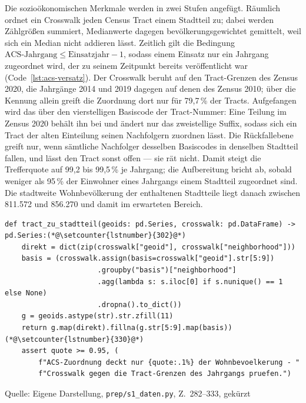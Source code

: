 \documentclass[12pt,a4paper]{article}
\newcommand{\tabquelle}[1][Eigene Darstellung]{%
  \par\setlength{\parskip}{0pt}\vspace{3pt}%
  {\setstretch{1}\fontsize{9pt}{11pt}\selectfont\raggedright Quelle: #1\par}%
}
\begin{document}
Die sozioökonomischen Merkmale werden in zwei Stufen angefügt. Räumlich ordnet
ein Crosswalk jeden Census Tract einem Stadtteil zu; dabei werden Zählgrößen
summiert, Medianwerte dagegen bevölkerungsgewichtet gemittelt, weil sich ein
Median nicht addieren lässt. Zeitlich gilt die Bedingung
$\text{ACS-Jahrgang} \le \text{Einsatzjahr} - 1$, sodass einem Einsatz nur ein
Jahrgang zugeordnet wird, der zu seinem Zeitpunkt bereits veröffentlicht war
(Code~\ref{lst:acs-versatz}). Der Crosswalk beruht auf den Tract-Grenzen
des Zensus 2020, die Jahrgänge 2014 und 2019 dagegen auf denen des Zensus 2010;
über die Kennung allein greift die Zuordnung dort nur für 79,7\,\% der Tracts.
Aufgefangen wird das über den vierstelligen Basiscode der Tract-Nummer: Eine
Teilung im Zensus 2020 behält ihn bei und ändert nur das zweistellige Suffix,
sodass sich ein Tract der alten Einteilung seinen Nachfolgern zuordnen lässt.
Die Rückfallebene greift nur, wenn sämtliche Nachfolger desselben Basiscodes in
denselben Stadtteil fallen, und lässt den Tract sonst offen --- sie rät nicht.
Damit steigt die Trefferquote auf 99,2 bis 99,5\,\% je Jahrgang; die
Aufbereitung bricht ab, sobald weniger als 95\,\% der Einwohner eines Jahrgangs
einem Stadtteil zugeordnet sind. Die stadtweite Wohnbevölkerung der enthaltenen
Stadtteile liegt danach zwischen 811.572 und 856.270 und damit im erwarteten
Bereich.

\begin{quellcode}[htbp]
\caption{Zuordnung über Zensusgrenzen hinweg}
\label{lst:crosswalk}\vspace{-3.5pt}
\begin{lstlisting}[style=pythonstil,firstnumber=282]
def tract_zu_stadtteil(geoids: pd.Series, crosswalk: pd.DataFrame) -> pd.Series:(*@\setcounter{lstnumber}{302}@*)
    direkt = dict(zip(crosswalk["geoid"], crosswalk["neighborhood"]))
    basis = (crosswalk.assign(basis=crosswalk["geoid"].str[5:9])
                      .groupby("basis")["neighborhood"]
                      .agg(lambda s: s.iloc[0] if s.nunique() == 1 else None)
                      .dropna().to_dict())
    g = geoids.astype(str).str.zfill(11)
    return g.map(direkt).fillna(g.str[5:9].map(basis))(*@\setcounter{lstnumber}{330}@*)
    assert quote >= 0.95, (
        f"ACS-Zuordnung deckt nur {quote:.1%} der Wohnbevoelkerung - "
        f"Crosswalk gegen die Tract-Grenzen des Jahrgangs pruefen.")
\end{lstlisting}
\tabquelle[Eigene Darstellung, \texttt{prep/s1\_daten.py}, Z.~282--333, gekürzt]
\end{quellcode}
\end{document}
